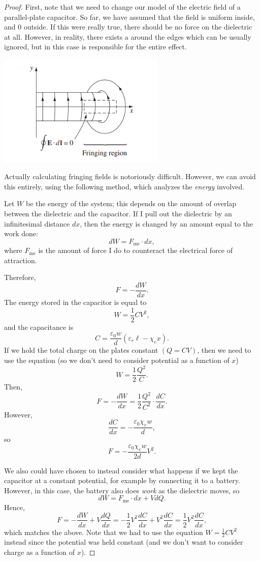 \begin{proof}
    First, note that we need to change our model of the electric field of a parallel-plate capacitor. So far, we have assumed that the field is uniform inside, and 0 outside. If this were really true, there should be no force on the dielectric at all. However, in reality, there exists a  around the edges which can be usually ignored, but in this case is responsible for the entire effect.
    
    \begin{center}
    \includegraphics[width=8cm]{Electrodynamics/images/fig4.31.PNG}
    \end{center}
    
    Actually calculating fringing fields is notoriously difficult. However, we can avoid this entirely, using the following method, which analyzes the \textit{energy} involved.
    
    Let $W$ be the energy of the system; this depends on the amount of overlap between the dielectric and the capacitor. If I pull out the dielectric by an infinitesimal distance $dx$, then the energy is changed by an amount equal to the work done:
    \[dW=F_{\text{me}}\cdot dx,\]
    where $F_{\text{me}}$ is the amount of force I do to counteract the electrical force of attraction.
    
    Therefore,
    \[F=-\frac{dW}{dx}.\]
    The energy stored in the capacitor is equal to
    \[W=\frac{1}{2}CV^2,\]
    and the capacitance is
    \[C=\frac{\varepsilon_0 w}{d}(\varepsilon_r\ell-\chi_e x).\]
    If we hold the total charge on the plates constant $(Q=CV)$, then we need to use the equation (so we don't need to consider potential as a function of $x$)
    \[W=\frac{1}{2}\frac{Q^2}{C}.\]
    Then,
    \[F=-\frac{dW}{dx}=\frac{1}{2}\frac{Q^2}{C^2}\cdot\frac{dC}{dx}.\]
    However,
    \[\frac{dC}{dx}=-\frac{\varepsilon_0\chi_ew}{d},\]
    so
    \[\boxed{F=-\frac{\varepsilon_0\chi_ew}{2d}V^2}.\]
    
    We also could have chosen to instead consider what happens if we kept the capacitor at a constant potential, for example by connecting it to a battery. However, in this case, the battery also does \textit{work} as the dielectric moves, so
    \[dW=F_{\text{me}}\cdot dx+VdQ.\]
    Hence,
    \[F=-\frac{dW}{dx}+V\frac{dQ}{dx}=-\frac{1}{2}V^2\frac{dC}{dx}+V^2\frac{dC}{dx}=\frac{1}{2}V^2\frac{dC}{dx},\]
    which matches the above. Note that we had to use the equation $W=\frac{1}{2}CV^2$ instead since the potential was held constant (and we don't want to consider charge as a function of $x$).
\end{proof}

